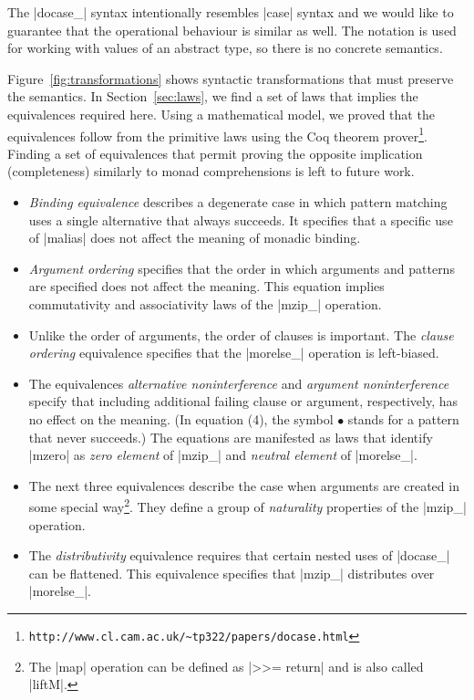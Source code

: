 \documentclass{sigplanconf}
\begin{document}
The |docase_| syntax intentionally resembles |case| syntax and we would like to guarantee 
that the operational behaviour is similar as well. The notation is used for working with values of an 
abstract type, so there is no concrete semantics. 

Figure~\ref{fig:transformations} shows syntactic transformations that must preserve
the semantics. In Section~\ref{sec:laws}, we find a set of laws that implies the equivalences
required here. Using a mathematical model, we proved that the equivalences follow from the primitive
laws using the Coq theorem prover\footnote{\texttt{http://www.cl.cam.ac.uk/\textasciitilde tp322/papers/docase.html}}. 
Finding a set of equivalences that permit proving the opposite implication 
(completeness) similarly to monad comprehensions \cite{comprehendingmonads} is left to future work.

\begin{itemize}
\item \textit{Binding equivalence} describes a degenerate case in which pattern matching uses
  a single alternative that always succeeds. It specifies that a specific use of |malias|
  does not affect the meaning of monadic binding.
  
\item \textit{Argument ordering} specifies that the order in which arguments and patterns are
  specified does not affect the meaning. This equation implies commutativity and associativity 
  laws of the |mzip_| operation.

\item Unlike the order of arguments, the order of clauses is important. The
  \textit{clause ordering} equivalence specifies that the |morelse_| operation is left-biased.

\item The equivalences \textit{alternative noninterference} and \textit{argument noninterference}
  specify that including additional failing clause or argument, respectively, has no effect on the meaning. (In 
  equation (4), the symbol $\bullet$ stands for a pattern that never succeeds.) The equations are
  manifested as laws that identify |mzero| as \textit{zero element} of |mzip_| and \textit{neutral
  element} of |morelse_|.

\item The next three equivalences describe the case when arguments are created in some special 
  way\footnote{The |map| operation can be defined as |>>= return| and is also called |liftM|.}.
  They define a group of \textit{naturality} properties of the |mzip_| operation.

\item The \textit{distributivity} equivalence requires that certain nested uses of |docase_| can 
  be flattened. This equivalence specifies that |mzip_| distributes over |morelse_|.
\end{itemize}
\end{document}
